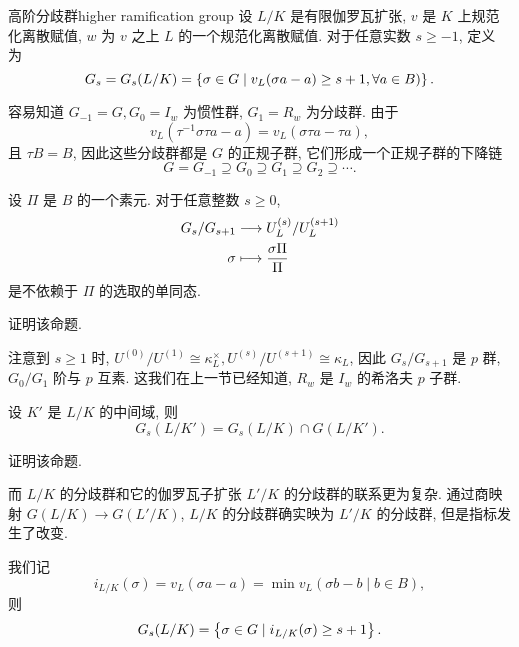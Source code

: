 \begin{definition}{高阶分歧群}{higher ramification group}
设 $L/K$ 是有限伽罗瓦扩张, $v$ 是 $K$ 上规范化离散赋值, $w$ 为 $v$ 之上 $L$ 的一个规范化离散赋值.
对于任意实数 $s\ge -1$, 定义 为
  \[G_s=G_s(L/K)=\left\{\sigma\in G\mid v_L(\sigma a-a)\ge s+1,\forall a\in B)\right\}.\]
\end{definition}

容易知道 $G_{-1}=G, G_0=I_w$ 为惯性群, $G_1=R_w$ 为分歧群.
由于
  \[v_L(\tau^{-1}\sigma \tau a-a)=v_L(\sigma \tau a-\tau a),\]
且 $\tau B=B$, 因此这些分歧群都是 $G$ 的正规子群, 它们形成一个正规子群的下降链
  \[G=G_{-1}\supseteq G_0\supseteq G_1\supseteq G_2\supseteq \cdots.\]

\begin{proposition}{}{}
设 $\Pi$ 是 $B$ 的一个素元. 对于任意整数 $s\ge 0$,
  \[\begin{split}G_s/G_{s+1} &\longrightarrow U_L^{(s)}/U_L^{(s+1)} \\ \sigma &\longmapsto \frac{\sigma \Pi}{\Pi}\end{split}\]
是不依赖于 $\Pi$ 的选取的单同态.
\end{proposition}

\begin{exercise}
证明该命题.
\end{exercise}

注意到 $s\ge 1$ 时, $U^{(0)}/U^{(1)}\cong \kappa_L^\times, U^{(s)}/U^{(s+1)}\cong \kappa_L$, 因此 $G_s/G_{s+1}$ 是 $p$ 群, $G_0/G_1$ 阶与 $p$ 互素. 这我们在上一节已经知道, $R_w$ 是 $I_w$ 的希洛夫 $p$ 子群.

\begin{proposition}{}{}
设 $K'$ 是 $L/K$ 的中间域, 则
  \[G_s(L/K')=G_s(L/K)\cap G(L/K').\]
\end{proposition}

\begin{exercise}
证明该命题.
\end{exercise}

而 $L/K$ 的分歧群和它的伽罗瓦子扩张 $L'/K$ 的分歧群的联系更为复杂. 通过商映射 $G(L/K)\to G(L'/K)$, $L/K$ 的分歧群确实映为 $L'/K$ 的分歧群, 但是指标发生了改变.

我们记
  \[i_{L/K}(\sigma)=v_L(\sigma a-a)=\min{v_L(\sigma b-b\mid b\in B)},\]
则
  \[G_s(L/K)=\left\{\sigma\in G\mid i_{L/K}(\sigma)\ge s+1\right\}.\]

